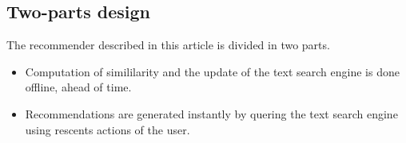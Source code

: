 \subsection{Two-parts design}

The recommender described in this article is divided in two parts.
\begin{itemize}
\item Computation of simililarity and the update of the text search engine is done offline, ahead of time.
\item Recommendations are generated instantly by quering the text search engine using rescents actions of the user.
\end{itemize}
